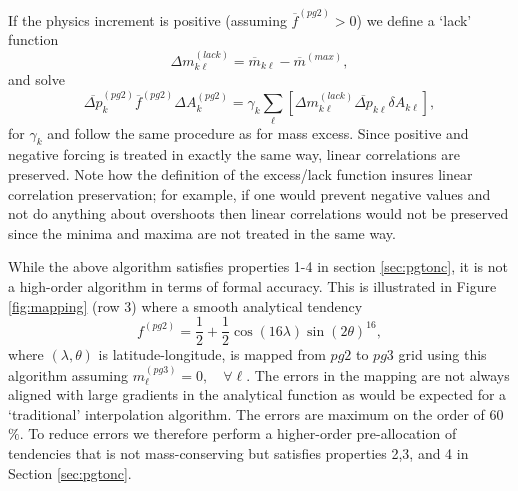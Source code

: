 \documentclass[draft,linenumbers]{agujournal}
\begin{document}
If the physics increment is positive (assuming ${\overline{f}}^{(pg2)}>0$) we define a `lack' function
\begin{equation}
\Delta m^{(lack)}_{k\ell}=\overline{m}_{k\ell}-\overline{m}^{(max)},
\end{equation}
and solve
\begin{equation}
\label{eq:mass-lack}
\overline{\Delta p}_k^{(pg2)}{\overline{f}}^{(pg2)}\Delta A_k^{(pg2)}=\gamma_k \sum_\ell \left[ \Delta m^{(lack)}_{k\ell}\overline{\Delta p}_{k\ell} \delta A_{k\ell}\right],
\end{equation}
for $\gamma_k$ and follow the same procedure as for mass excess. Since positive and negative forcing is treated in exactly the same way, linear correlations are preserved. Note how the definition of the excess/lack function insures linear correlation preservation; for example, if one would prevent negative values and not do anything about overshoots then linear correlations would not be preserved since the minima and maxima are not treated in the same way.

While the above algorithm satisfies properties 1-4 in section \ref{sec:pgtonc}, it is not a high-order algorithm in terms of formal accuracy. This is illustrated in Figure \ref{fig:mapping} (row 3) where a smooth analytical tendency \citep[approximate spherical harmonic of order 32 and azimuthal wave number 16; ][]{J1999MWR}
\begin{equation}
\label{eq:Y32}
f^{(pg2)}=\frac{1}{2}+\frac{1}{2}\cos(16\lambda)\sin(2\theta)^{16},
\end{equation}
where $(\lambda,\theta)$ is latitude-longitude, is mapped from $pg2$ to $pg3$ grid using this algorithm assuming $m^{(pg3)}_\ell=0, \quad \forall \ell$. The errors in the mapping are not always aligned with large gradients in the analytical function as would be expected for a `traditional' interpolation algorithm. The errors are maximum on the order of 60$\%$. To reduce errors we therefore perform a higher-order pre-allocation of tendencies that is not mass-conserving but satisfies properties 2,3, and 4 in Section \ref{sec:pgtonc}.
\end{document}
